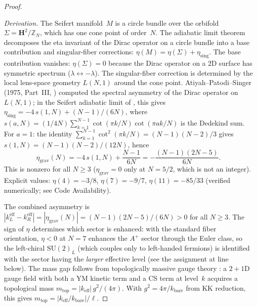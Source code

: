 \begin{proof}
\begin{enumerate}
  \emph{Derivation.}
  The Seifert manifold~$M$ is a circle bundle over the
  orbifold $\Sigma = \mathbf{H}^2/\mathbb{Z}_N$, which has
  one cone point of order~$N$.
  The adiabatic limit theorem
  \citep{BismutCheeger1989,Dai1991}
  decomposes the eta invariant of the Dirac operator
  on a circle bundle into a base contribution
  and singular-fiber corrections:
  $\eta(M) = \eta(\Sigma) + \eta_{\mathrm{sing}}$.
  The base contribution vanishes:
  $\eta(\Sigma) = 0$ because the Dirac operator on a
  $2$D surface has symmetric spectrum
  ($\lambda \leftrightarrow -\lambda$).
  The singular-fiber correction is determined by the
  local lens-space geometry $L(N,1)$ around the cone
  point.  Atiyah--Patodi--Singer (1975, Part~III,
  \citealt{AtiyahPatodiSinger1975III})
  computed the spectral asymmetry of the Dirac operator
  on $L(N,1)$; in the Seifert adiabatic limit of
  \citet{BismutCheeger1989, Dai1991}, this gives
  $\eta_{\mathrm{sing}} = -4\,s(1,N) + (N{-}1)/(6N)$,
  where $s(a,N) = (1/4N)\sum_{k=1}^{N-1}
  \cot(\pi k/N)\cot(\pi ak/N)$ is the Dedekind sum.
  For $a = 1$: the identity
  $\sum_{k=1}^{N-1}\cot^2(\pi k/N) = (N{-}1)(N{-}2)/3$
  gives $s(1,N) = (N{-}1)(N{-}2)/(12N)$, hence
  \begin{equation}\label{eq:eta-grav}
    \eta_{\mathrm{grav}}(N)
    = -4\,s(1,N) + \frac{N{-}1}{6N}
    = -\frac{(N{-}1)(2N{-}5)}{6N}.
  \end{equation}
  This is nonzero for all $N \ge 3$ ($\eta_{\mathrm{grav}} = 0$
  only at $N = 5/2$, which is not an integer).
  Explicit values: $\eta(4) = -3/8$, $\eta(7) = -9/7$,
  $\eta(11) = -85/33$
  (verified numerically; see Code Availability).
\end{enumerate}
The combined asymmetry is
$|k_L^{\mathrm{eff}} - k_R^{\mathrm{eff}}|
= |\eta_{\mathrm{grav}}(N)| = (N{-}1)(2N{-}5)/(6N) > 0$
for all $N \ge 3$.
The sign of $\eta$ determines which sector is enhanced:
with the standard fiber orientation, $\eta < 0$ at $N=7$
enhances the $A^+$ sector through the Euler class, so the
left-chiral $\mathrm{SU}(2)_L$ (which couples only to
left-handed fermions) is identified with the sector having
the \emph{larger} effective level (see the assignment at
line~\pageref{assignment:SU2L} below).
The mass gap follows from topologically massive gauge theory
\citep{DeserJackiwTempleton1982}:
a $2{+}1$D gauge field with both a YM kinetic term and
a CS term at level~$k$ acquires a topological mass
$m_{\mathrm{top}} = |k_{\mathrm{eff}}|\,g^2/(4\pi)$.
With $g^2 = 4\pi/k_{\mathrm{bare}}$ from KK reduction,
this gives $m_{\mathrm{top}} = |k_{\mathrm{eff}}/k_{\mathrm{bare}}|/\ell$.

\end{proof}
